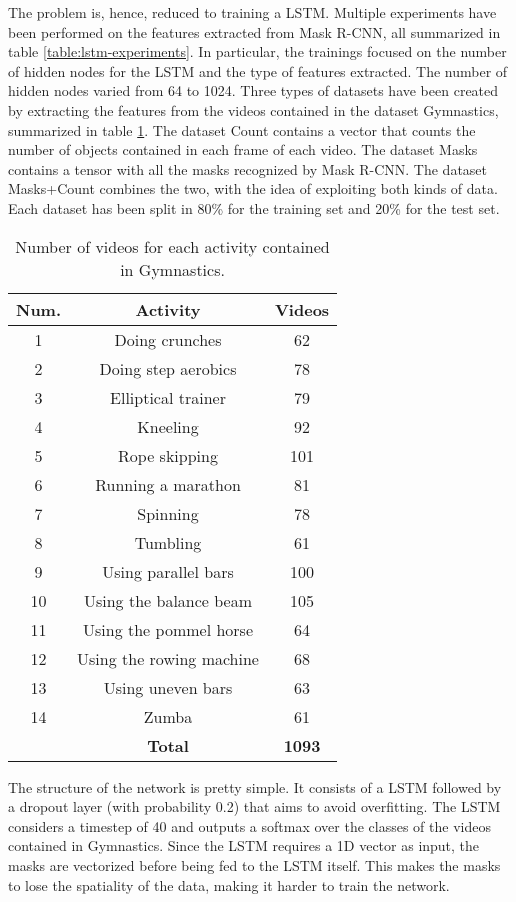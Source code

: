 \documentclass[12pt]{article}
\numberwithin{equation}{section} %
\numberwithin{figure}{section} %
\numberwithin{table}{section} %
\theoremstyle{definition}
\begin{document}
The problem is, hence, reduced to training a LSTM. Multiple
experiments have been performed on the features extracted
from Mask R-CNN, all summarized in table
\ref{table:lstm-experiments}. In particular, the trainings
focused on the number of hidden nodes for the LSTM and the
type of features extracted. The number of hidden nodes
varied from 64 to 1024. Three types of datasets have
been created by extracting the features from the videos
contained in the dataset Gymnastics, summarized in table
\ref{table:activity-dataset}.
The dataset Count contains a vector
that counts the number of objects contained in each frame of
each video. The dataset Masks contains a tensor with all the
masks recognized by Mask R-CNN. The dataset Masks+Count
combines the two, with the idea of exploiting both kinds
of data. Each dataset has been split in 80\% for the training
set and 20\% for the test set.

\begin{table}
	\centering
	\begin{tabular}{*{3}{c}}
		Num. & Activity & Videos \\
		\hline
		1 & Doing crunches & 62 \\
		2 & Doing step aerobics & 78 \\
		3 & Elliptical trainer & 79 \\
		4 & Kneeling & 92 \\
		5 & Rope skipping & 101 \\
		6 & Running a marathon & 81 \\
		7 & Spinning & 78 \\
		8 & Tumbling & 61 \\
		9 & Using parallel bars & 100 \\
		10 & Using the balance beam & 105 \\
		11 & Using the pommel horse & 64 \\
		12 & Using the rowing machine & 68 \\
		13 & Using uneven bars & 63 \\
		14 & Zumba & 61 \\
		\hline
		& \textbf{Total} & \textbf{1093}
	\end{tabular}
	\caption{Number of videos for each activity contained in Gymnastics.}
	\label{table:activity-dataset}
\end{table}

The structure of the network is pretty simple. It consists
of a LSTM followed by a dropout layer (with probability 0.2)
that aims to avoid overfitting. The LSTM considers a timestep
of 40 and outputs a softmax over the classes of the videos
contained in Gymnastics. Since the LSTM requires a 1D vector
as input, the masks are vectorized before being fed to the
LSTM itself. This makes the masks to lose the spatiality
of the data, making it harder to train the network.
\end{document}
